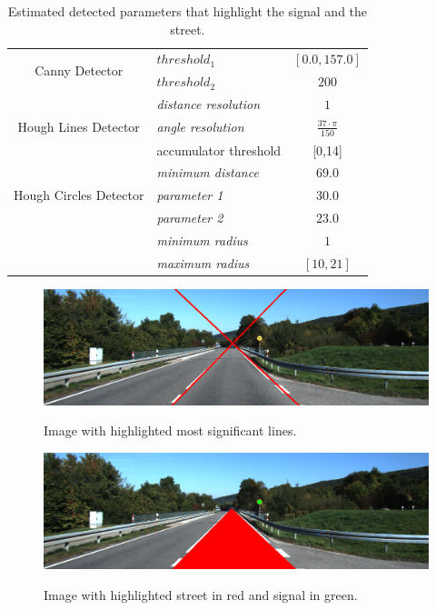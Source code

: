 \documentclass{article}
\begin{document}
\begin{table}[h]
\centering
\begin{tabular}{|c|l|c|}
\hline
\multirow{2}{*}{Canny Detector}&{$threshold_1$}&{$[0.0, 157.0]$}\\
\cline{2-3}
&{$threshold_2$}&{$200$}\\
\hline
\multirow{3}{*}{Hough Lines Detector}&{\textit{distance resolution}}&{$1$}\\
\cline{2-3}
&{\textit{angle resolution}}&{$\frac{37\cdot \pi}{150}$}\\
\cline{2-3}
&{accumulator threshold}&{[0,14]}\\
\hline
\multirow{3}{*}{Hough Circles Detector}&{\textit{minimum distance}}&{$69.0$}\\
\cline{2-3}
&{\textit{parameter 1}}&{$30.0$}\\
\cline{2-3}
&{\textit{parameter 2}}&{$23.0$}\\
\cline{2-3}
&{\textit{minimum radius}}&{$1$}\\
\cline{2-3}
&{\textit{maximum radius}}&{$[10,21]$}\\
\hline
\end{tabular}
\caption{Estimated detected parameters that highlight the signal and the street.}\label{param}
\end{table}
\begin{figure}[h]
\begin{center}
  \includegraphics[scale=0.38]{result_lines}\\ 
  \caption{\footnotesize{Image with highlighted most significant lines.}}\label{result_lines} 
\end{center} 
\end{figure}
\begin{figure}[h]
\begin{center}
  \includegraphics[scale=0.38]{result}\\ 
  \caption{\footnotesize{Image with highlighted street in red and signal in green.}}\label{result} 
\end{center} 
\end{figure}
\end{document}
